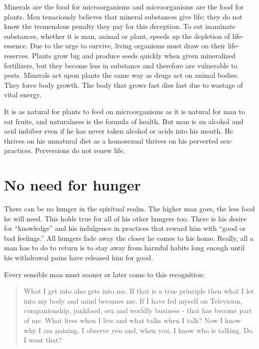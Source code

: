 \documentclass[landscape,twocolumn,letterpaper]{article}
\begin{document}
Minerals are the food for microorganisms and microorganisms are the
food for plants. Men tenaciously believes that mineral substances give
life; they do not know the tremendous penalty they pay for this
deception. To eat inaminate substances, whether it is man, animal or
plant, speeds up the depletion of life-essence. Due to the urge to
survive, living organisms must draw on their life-reserves. Plants
grow big and produce seeds quickly when given mineralized fertilizers,
but they become less in substance and therefore are vulnerable to
pests. Minerals act upon plants the same way as drugs act on animal
bodies. They force body growth. The body that grows fast dies fast due
to wastage of vital energy.

It is as natural for plants to feed on microorganisms as it is natural
for man to eat fruits, and naturalness is the formula of health. But
man is an alcohol and acid imbiber even if he has never taken alcohol
or acids into his mouth. He thrives on his unnatural diet as a
homosexual thrives on his perverted sex-practices. Perversions do not
renew life.

\section{No need for hunger}

There can be no hunger in the spiritual realm. The higher man goes,
the less food he will need. This holds true for all of his other
hungers too. There is his desire for ``knowledge'' and his indulgence
in practices that reward him with ``good or bad feelings.'' All
hungers fade away the closer he comes to his home. Really, all a man
has to do to return is to stay away from harmful habits long enough
until his withdrawal pains have released him for good.

Every sensible man must sooner or later come to this recognition:
\begin{quote} What I get into also gets into me. If that is a true
principle then what I let into my body and mind becomes me. If I have
fed myself on Television, companionship, junkfood, sex and worldly
business - that has become part of me. What lives when I live and what
talks when I talk? Now I know why I am paining. I observe you and,
when you, I know who is talking. Do I want that?
\end{quote}
\end{document}
